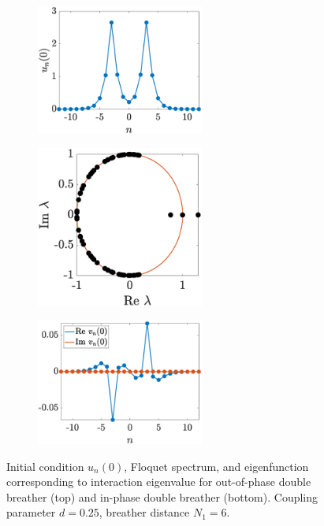 \documentclass[12pt,reqno]{amsart}
\theoremstyle{definition}
\begin{document}
\begin{figure}
\begin{center}
\begin{subfigure}{0.3\linewidth}
		\label{fig:doublec}
	\end{subfigure}
	\begin{subfigure}{0.3\linewidth}
		\caption{}
		\includegraphics[width=5.5cm]{doubleppun0.eps} \hspace{-0.5cm}
		\label{fig:doubled}
	\end{subfigure}
	\begin{subfigure}{0.3\linewidth}
		\caption{}
		\includegraphics[width=5.5cm]{doubleppspec.eps} \hspace{-0.5cm}
		\label{fig:doublee}
	\end{subfigure}
	\begin{subfigure}{0.3\linewidth}
		\caption{}
		\includegraphics[width=5.5cm]{doubleppinteig.eps}
		\label{fig:doublef} 
	\end{subfigure}
	\end{center}
	\caption{Initial condition $u_n(0)$, Floquet spectrum, and eigenfunction corresponding to interaction eigenvalue for out-of-phase double breather (top) and in-phase double breather (bottom). Coupling parameter $d = 0.25$, breather distance $N_1 = 6$.}
	\label{fig:double}
\end{figure}
\end{document}
